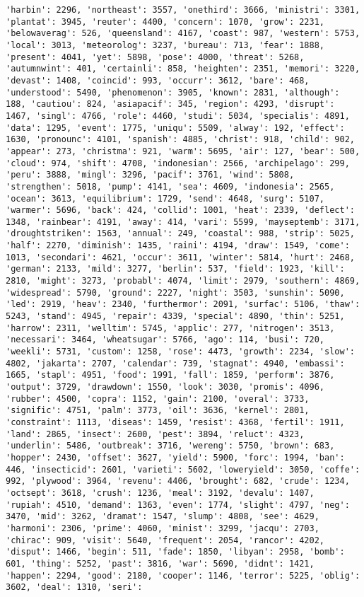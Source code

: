 \documentclass[11pt]{article}
\begin{document}
\begin{Verbatim}[commandchars=\\\{\}]
'harbin': 2296, 'northeast': 3557, 'onethird': 3666, 'ministri': 3301, 'plantat': 3945, 'reuter': 4400, 'concern': 1070, 'grow': 2231, 'belowaverag': 526, 'queensland': 4167, 'coast': 987, 'western': 5753, 'local': 3013, 'meteorolog': 3237, 'bureau': 713, 'fear': 1888, 'present': 4041, 'yet': 5898, 'pose': 4000, 'threat': 5268, 'autumnwint': 401, 'certainli': 858, 'heighten': 2351, 'memori': 3220, 'devast': 1408, 'coincid': 993, 'occurr': 3612, 'bare': 468, 'understood': 5490, 'phenomenon': 3905, 'known': 2831, 'although': 188, 'cautiou': 824, 'asiapacif': 345, 'region': 4293, 'disrupt': 1467, 'singl': 4766, 'role': 4460, 'studi': 5034, 'specialis': 4891, 'data': 1295, 'event': 1775, 'uniqu': 5509, 'alway': 192, 'effect': 1630, 'pronounc': 4101, 'spanish': 4885, 'christ': 918, 'child': 902, 'appear': 273, 'christma': 921, 'warm': 5695, 'air': 127, 'bear': 500, 'cloud': 974, 'shift': 4708, 'indonesian': 2566, 'archipelago': 299, 'peru': 3888, 'mingl': 3296, 'pacif': 3761, 'wind': 5808, 'strengthen': 5018, 'pump': 4141, 'sea': 4609, 'indonesia': 2565, 'ocean': 3613, 'equilibrium': 1729, 'send': 4648, 'surg': 5107, 'warmer': 5696, 'back': 424, 'collid': 1001, 'heat': 2339, 'deflect': 1348, 'rainbear': 4191, 'away': 414, 'vari': 5599, 'mayseptemb': 3171, 'droughtstriken': 1563, 'annual': 249, 'coastal': 988, 'strip': 5025, 'half': 2270, 'diminish': 1435, 'raini': 4194, 'draw': 1549, 'come': 1013, 'secondari': 4621, 'occur': 3611, 'winter': 5814, 'hurt': 2468, 'german': 2133, 'mild': 3277, 'berlin': 537, 'field': 1923, 'kill': 2810, 'might': 3273, 'probabl': 4074, 'limit': 2979, 'southern': 4869, 'widespread': 5790, 'ground': 2227, 'night': 3503, 'sunshin': 5090, 'led': 2919, 'heav': 2340, 'furthermor': 2091, 'surfac': 5106, 'thaw': 5243, 'stand': 4945, 'repair': 4339, 'special': 4890, 'thin': 5251, 'harrow': 2311, 'welltim': 5745, 'applic': 277, 'nitrogen': 3513, 'necessari': 3464, 'wheatsugar': 5766, 'ago': 114, 'busi': 720, 'weekli': 5731, 'custom': 1258, 'rose': 4473, 'growth': 2234, 'slow': 4802, 'jakarta': 2707, 'calendar': 739, 'stagnat': 4940, 'embassi': 1665, 'stapl': 4951, 'food': 1991, 'fall': 1859, 'perform': 3876, 'output': 3729, 'drawdown': 1550, 'look': 3030, 'promis': 4096, 'rubber': 4500, 'copra': 1152, 'gain': 2100, 'overal': 3733, 'signific': 4751, 'palm': 3773, 'oil': 3636, 'kernel': 2801, 'constraint': 1113, 'diseas': 1459, 'resist': 4368, 'fertil': 1911, 'land': 2865, 'insect': 2600, 'pest': 3894, 'reluct': 4323, 'underlin': 5486, 'outbreak': 3716, 'wereng': 5750, 'brown': 683, 'hopper': 2430, 'offset': 3627, 'yield': 5900, 'forc': 1994, 'ban': 446, 'insecticid': 2601, 'varieti': 5602, 'loweryield': 3050, 'coffe': 992, 'plywood': 3964, 'revenu': 4406, 'brought': 682, 'crude': 1234, 'octsept': 3618, 'crush': 1236, 'meal': 3192, 'devalu': 1407, 'rupiah': 4510, 'demand': 1363, 'even': 1774, 'slight': 4797, 'neg': 3470, 'mid': 3262, 'dramat': 1547, 'slump': 4808, 'see': 4629, 'harmoni': 2306, 'prime': 4060, 'minist': 3299, 'jacqu': 2703, 'chirac': 909, 'visit': 5640, 'frequent': 2054, 'rancor': 4202, 'disput': 1466, 'begin': 511, 'fade': 1850, 'libyan': 2958, 'bomb': 601, 'thing': 5252, 'past': 3816, 'war': 5690, 'didnt': 1421, 'happen': 2294, 'good': 2180, 'cooper': 1146, 'terror': 5225, 'oblig': 3602, 'deal': 1310, 'seri': 
\end{Verbatim}
\end{document}
